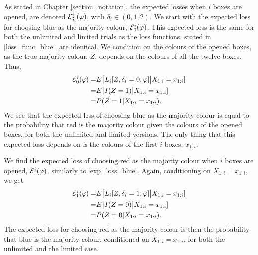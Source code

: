 As stated in Chapter \ref{section_notation}, the expected losses when $i$ boxes are opened, are denoted $\mathcal{E}_{\delta_i}^i(\varphi)$, with $\delta_i \in (0,1,2)$.
We start with the expected loss for choosing blue as the majority colour, $\mathcal{E}^i_0(\varphi)$. This expected loss is the same for both the unlimited and limited trials as the loss functions, stated in \eqref{loss_func_blue}, are identical. 
We condition on the colours of the opened boxes, as the true majority colour, $Z$, depends on the colours of all the twelve boxes. Thus,
\begin{equation}
\label{exp_loss_blue}
    \begin{aligned}
        \mathcal{E}^i_{0}(\varphi) = &E\big[ L_i[Z,\delta_i=0;\varphi] \big |X_{1:i}=x_{1:i} ]\\
        = & E \big[ I(Z=1) \big|X_{1:i}=x_{1:i}]\\
        = & P(Z=1|X_{1:i}=x_{1:i}).
    \end{aligned}
\end{equation}
We see that the expected loss of choosing blue as the majority colour is equal to the probability that red is the majority colour given the colours of the opened boxes, for both the unlimited and limited versions. The only thing that this expected loss depends on is the colours of the first $i$ boxes, $x_{1:i}$. 

We find the expected loss of choosing red as the majority colour when $i$ boxes are opened, $\mathcal{E}^i_{1}(\varphi)$, similarly to \eqref{exp_loss_blue}. Again, conditioning on $X_{1:i}=x_{1:i}$, we get
\begin{equation}
\label{exp_loss_red}
    \begin{aligned}
        \mathcal{E}^i_{1}(\varphi) 
        = &E\big[ L_i[Z,\delta_i=1;\varphi] \big |X_{1:i}=x_{1:i} ]\\
        = & E \big[ I(Z=0) \big|X_{1:i}=x_{1:i}]\\
        = & P(Z=0|X_{1:i}=x_{1:i}).
    \end{aligned}
\end{equation}
The expected loss for choosing red as the majority colour is then the probability that blue is the majority colour, conditioned on $X_{1:i}=x_{1:i}$, for both the unlimited and the limited case.

